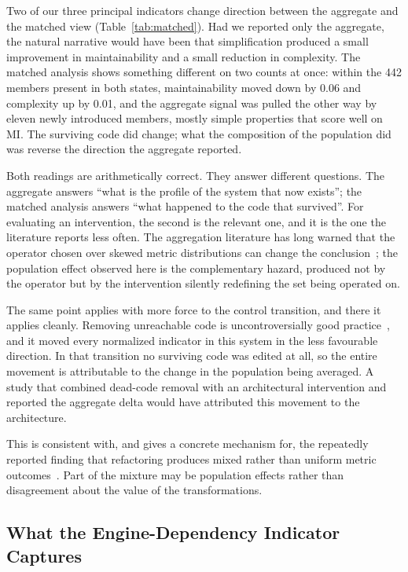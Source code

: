 \documentclass[pdflatex,sn-basic]{sn-jnl}
\begin{document}
Two of our three principal indicators change direction between the aggregate and the matched view (Table~\ref{tab:matched}). Had we reported only the aggregate, the natural narrative would have been that simplification produced a small improvement in maintainability and a small reduction in complexity. The matched analysis shows something different on two counts at once: within the 442 members present in both states, maintainability moved down by 0.06 and complexity up by 0.01, and the aggregate signal was pulled the other way by eleven newly introduced members, mostly simple properties that score well on MI\@. The surviving code did change; what the composition of the population did was reverse the direction the aggregate reported.

Both readings are arithmetically correct. They answer different questions. The aggregate answers ``what is the profile of the system that now exists''; the matched analysis answers ``what happened to the code that survived''. For evaluating an intervention, the second is the relevant one, and it is the one the literature reports less often. The aggregation literature has long warned that the operator chosen over skewed metric distributions can change the conclusion~\citep{vasilescu2011,mordal2013}; the population effect observed here is the complementary hazard, produced not by the operator but by the intervention silently redefining the set being operated on.

The same point applies with more force to the control transition, and there it applies cleanly. Removing unreachable code is uncontroversially good practice~\citep{romano2020,eder2012}, and it moved every normalized indicator in this system in the less favourable direction. In that transition no surviving code was edited at all, so the entire movement is attributable to the change in the population being averaged. A study that combined dead-code removal with an architectural intervention and reported the aggregate delta would have attributed this movement to the architecture.

This is consistent with, and gives a concrete mechanism for, the repeatedly reported finding that refactoring produces mixed rather than uniform metric outcomes~\citep{szoke2017,bavota2015,palomba2018}. Part of the mixture may be population effects rather than disagreement about the value of the transformations.

\subsection{What the Engine-Dependency Indicator Captures}
\end{document}

